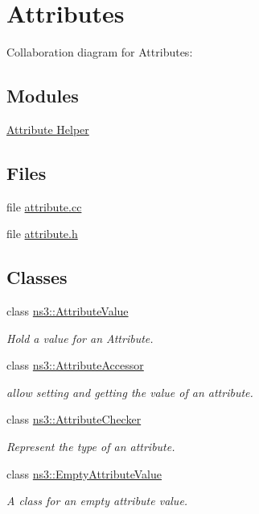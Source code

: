 \hypertarget{group__attribute}{}\section{Attributes}
\label{group__attribute}
Collaboration diagram for Attributes\+:
\subsection*{Modules}
\begin{DoxyCompactItemize}
\item 
\hyperlink{group__attributehelper}{Attribute Helper}
\end{DoxyCompactItemize}
\subsection*{Files}
\begin{DoxyCompactItemize}
\item 
file \hyperlink{attribute_8cc}{attribute.\+cc}
\item 
file \hyperlink{attribute_8h}{attribute.\+h}
\end{DoxyCompactItemize}
\subsection*{Classes}
\begin{DoxyCompactItemize}
\item 
class \hyperlink{classns3_1_1AttributeValue}{ns3\+::\+Attribute\+Value}
\begin{DoxyCompactList}\small\item\em Hold a value for an Attribute. \end{DoxyCompactList}\item 
class \hyperlink{classns3_1_1AttributeAccessor}{ns3\+::\+Attribute\+Accessor}
\begin{DoxyCompactList}\small\item\em allow setting and getting the value of an attribute. \end{DoxyCompactList}\item 
class \hyperlink{classns3_1_1AttributeChecker}{ns3\+::\+Attribute\+Checker}
\begin{DoxyCompactList}\small\item\em Represent the type of an attribute. \end{DoxyCompactList}\item 
class \hyperlink{classns3_1_1EmptyAttributeValue}{ns3\+::\+Empty\+Attribute\+Value}
\begin{DoxyCompactList}\small\item\em A class for an empty attribute value. \end{DoxyCompactList}\end{DoxyCompactItemize}
